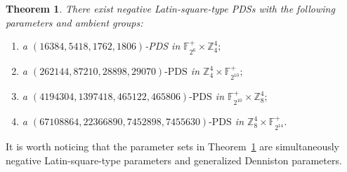 \documentclass[11pt]{article}
\newtheorem{theorem}{Theorem}[section]
\theoremstyle{definition}
\theoremstyle{remark}
\newcommand{\F}{\mathbb{F}}
\newcommand{\Z}{\mathbb{Z}}
\begin{document}
\begin{theorem}
\label{thm:main}
There exist negative Latin-square-type PDSs with
the following parameters and ambient groups:

\begin{enumerate}[label=(\arabic*)]
    \item a $(16384,5418,1762,1806)$-PDS in
   $\F_{2^6}^+\times\Z_4^4;$

    \item a $(262144,87210,28898,29070)\text{-PDS}
    $
    in
    $\Z_4^4\times\F_{2^{10}}^+;$

    \item a $(4194304,1397418,465122,465806)\text{-PDS}$ in
    $\F_{2^{10}}^+\times\Z_8^4;$

    \item a
    $(67108864,22366890,7452898,7455630)\text{-PDS}$
    in
    $\Z_8^4\times\F_{2^{14}}^+.$
\end{enumerate}
\end{theorem}


It is worth noticing that the parameter sets in Theorem~\ref{thm:main} are simultaneously
negative Latin-square-type parameters and generalized Denniston
parameters.
\end{document}
